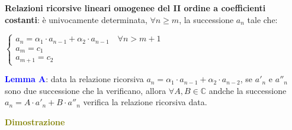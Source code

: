 \newpage
\begin{flushleft}
    \textbf{Relazioni ricorsive lineari omogenee del II ordine a coefficienti costanti}: è univocamente determinata, $\forall n \geq m$, la successione $a_n$ tale che: 

    {\centering
        $\begin{cases}
            a_n = \alpha_1 \cdot a_{n-1} + \alpha_2 \cdot a_{n-1} \quad \forall n > m + 1\\
            a_m = c_1 \\
            a_{m+1} = c_2
        \end{cases}$
    \par}

    \textcolor{blue}{\textbf{Lemma A}}: data la relazione ricorsiva $a_n = \alpha_1 \cdot a_{n-1} + \alpha_2 \cdot a_{n-2}$, se $a'_n$ e $a''_n$ sono due successione che la verificano, allora $\forall A, B \in \mathbb{C}$ andche la successione $a_n = A \cdot a'_n + B \cdot a''_n$ verifica la relazione ricorsiva data.
    \begin{boxA}
        \textcolor{olive}{\textbf{Dimostrazione}}


\end{boxA}
\end{flushleft}
